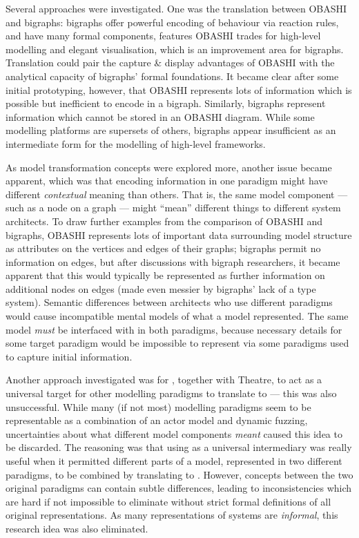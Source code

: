 \documentclass{article}
\begin{document}
Several approaches were investigated. One was the translation between OBASHI and
bigraphs: bigraphs offer powerful encoding of behaviour via reaction rules, and
have many formal components, features OBASHI trades for high-level modelling and
elegant visualisation, which is an improvement area for bigraphs. Translation
could pair the capture \& display advantages of OBASHI with the analytical
capacity of bigraphs' formal foundations. It became clear after some initial
prototyping, however, that OBASHI represents lots of information which is
possible but inefficient to encode in a bigraph. Similarly, bigraphs represent
information which cannot be stored in an OBASHI diagram. While some modelling
platforms are supersets of others, bigraphs appear insufficient as an
intermediate form for the modelling of high-level frameworks.\par

As model transformation concepts were explored more, another issue became
apparent, which was that encoding information in one paradigm might have
different \emph{contextual} meaning than others. That is, the same model
component --- such as a node on a graph --- might ``mean'' different things to
different system architects. To draw further examples from the comparison of
OBASHI and bigraphs, OBASHI represents lots of important data surrounding model
structure as attributes on the vertices and edges of their graphs; bigraphs
permit no information on edges, but after discussions with bigraph researchers,
it became apparent that this would typically be represented as further
information on additional nodes on edges (made even messier by bigraphs' lack of
a type system). Semantic differences between architects who use different
paradigms would cause incompatible mental models of what a model represented.
The same model \emph{must} be interfaced with in both paradigms, because
necessary details for some target paradigm would be impossible to represent via
some paradigms used to capture initial information.\par

Another approach investigated was for \pdsf{}, together with Theatre, to act as
a universal target for other modelling paradigms to translate to --- this was
also unsuccessful. While many (if not most) modelling paradigms seem to be
representable as a combination of an actor model and dynamic fuzzing,
uncertainties about what different model components \emph{meant} caused this
idea to be discarded. The reasoning was that using \pdsf{} as a universal
intermediary was really useful when it permitted different parts of a model,
represented in two different paradigms, to be combined by translating to
\pdsf{}. However, concepts between the two original paradigms can contain subtle
differences, leading to inconsistencies which are hard if not impossible to
eliminate without strict formal definitions of all original representations. As
many representations of systems are \emph{informal}, this research idea was also
eliminated.\par
\end{document}
